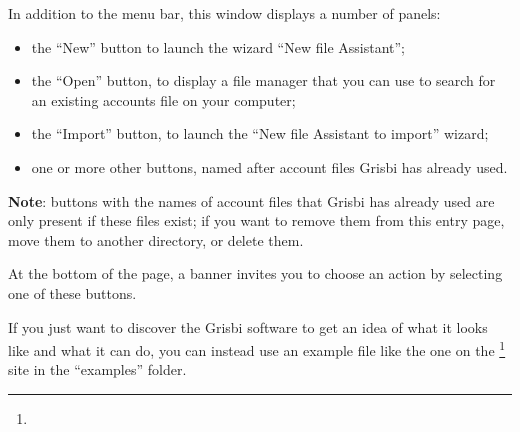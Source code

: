 
In addition to the menu bar, this window displays a number of panels:%

\begin{itemize}
	\item the \enquote{New} button to launch the wizard \enquote{New file Assistant};%
	\item the \enquote{Open} button, to display a file manager that you can use to search for an existing accounts file on your computer;%
	\item the \enquote{Import} button, to launch the \enquote{New file Assistant to import} wizard;%
	\item one or more other buttons, named after account files Grisbi has already used.%
\end{itemize}


\textbf{Note}: buttons with the names of account files that Grisbi has already used are only present if these files exist; if you want to remove them from this entry page, move them to another directory, or delete them.%


At the bottom of the page, a banner invites you to choose an action by selecting one of these buttons.%


If you just want to discover the Grisbi software to get an idea of what it looks like and what it can do, you can instead use an example file like the one on the \footnote{\urlSourceForgeDocumentation{}} site in the \enquote{\textsf{examples}} folder.%

